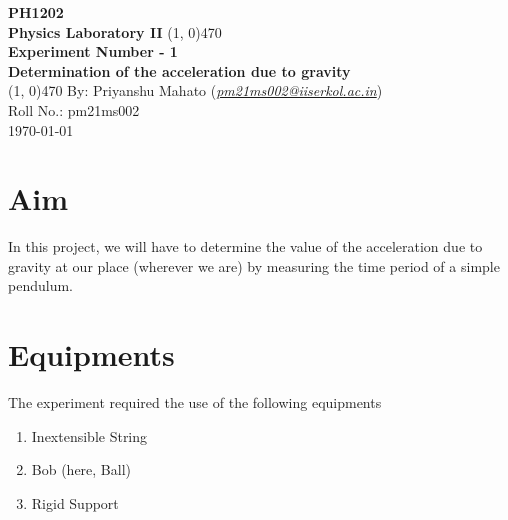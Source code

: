 \documentclass[12pt]{article}
\begin{document}
	\thispagestyle{empty}
	\begin{titlepage}
		\begin{center}
			\vspace{2cm}
			\huge\textbf{PH1202}\\
			\vspace{1cm}
			\large\textbf{Physics Laboratory II}
			\vfill
			\line(1, 0){470}\\[14pt]
			\huge\textbf{\color{ChadBlue}\sffamily Experiment Number - 1}\\[10pt]
			\Large\textbf{\color{mauve}\sffamily Determination of the acceleration due to gravity}\\[14pt]
			\line(1, 0){470}
			\vfill
			By: Priyanshu Mahato (\href{mailto:pm21ms002@iiserkol.ac.in}{\emph{\color{dkgreen}pm21ms002@iiserkol.ac.in}})\\
			Roll No.: pm21ms002\\
			\today
		\end{center}
	\end{titlepage}

	\section{Aim}
	In this project, we will have to determine the value of the acceleration due to gravity at our place (wherever we are) by measuring the time period of a simple pendulum. 
	
	\section{Equipments}
	The experiment required the use of the following equipments
	\begin{enumerate}
		\item Inextensible String
		\item Bob (here, Ball)
		\item Rigid Support
	\end{enumerate}
\end{document}
